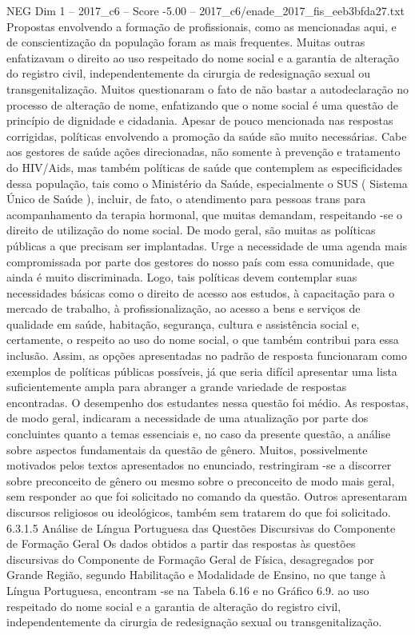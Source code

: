\begin{textsample}{NEG Dim 1 – 2017\_c6 – Score -5.00 – 2017\_c6/enade\_2017\_fis\_eeb3bfda27.txt}
Propostas envolvendo a formação de profissionais, como as mencionadas aqui, e de conscientização da população foram as mais frequentes.
Muitas outras enfatizavam o direito ao uso respeitado do nome social e a garantia de alteração do registro civil, independentemente da cirurgia de redesignação sexual ou transgenitalização.
Muitos questionaram o fato de não bastar a autodeclaração no processo de alteração de nome, enfatizando que o nome social é uma questão de princípio de dignidade e cidadania.
Apesar de pouco mencionada nas respostas corrigidas, políticas envolvendo a promoção da saúde são muito necessárias.
Cabe aos gestores de saúde ações direcionadas, não somente à prevenção e tratamento do HIV/Aids, mas também políticas de saúde que contemplem as especificidades dessa população, tais como o Ministério da Saúde, especialmente o SUS ( Sistema Único de Saúde ), incluir, de fato, o atendimento para pessoas trans para acompanhamento da terapia hormonal, que muitas demandam, respeitando -se o direito de utilização do nome social.
De modo geral, são muitas as políticas públicas a que precisam ser implantadas.
Urge a necessidade de uma agenda mais compromissada por parte dos gestores do nosso país com essa comunidade, que ainda é muito discriminada.
Logo, tais políticas devem contemplar suas necessidades básicas como o direito de acesso aos estudos, à capacitação para o mercado de trabalho, à profissionalização, ao acesso a bens e serviços de qualidade em saúde, habitação, segurança, cultura e assistência social e, certamente, o respeito ao uso do nome social, o que também contribui para essa inclusão.
Assim, as opções apresentadas no padrão de resposta funcionaram como exemplos de políticas públicas possíveis, já que seria difícil apresentar uma lista suficientemente ampla para abranger a grande variedade de respostas encontradas.
O desempenho dos estudantes nessa questão foi médio.
As respostas, de modo geral, indicaram a necessidade de uma atualização por parte dos concluintes quanto a temas essenciais e, no caso da presente questão, a análise sobre aspectos fundamentais da questão de gênero.
Muitos, possivelmente motivados pelos textos apresentados no enunciado, restringiram -se a discorrer sobre preconceito de gênero ou mesmo sobre o preconceito de modo mais geral, sem responder ao que foi solicitado no comando da questão.
Outros apresentaram discursos religiosos ou ideológicos, também sem tratarem do que foi solicitado. 6.3.1.5 Análise de Língua Portuguesa das Questões Discursivas do Componente de Formação Geral Os dados obtidos a partir das respostas às questões discursivas do Componente de Formação Geral de Física, desagregados por Grande Região, segundo Habilitação e Modalidade de Ensino, no que tange à Língua Portuguesa, encontram -se na Tabela 6.16 e no Gráfico 6.9. ao uso respeitado do nome social e a garantia de alteração do registro civil, independentemente da cirurgia de redesignação sexual ou transgenitalização.

\end{textsample}
